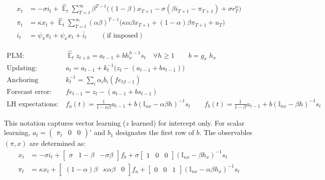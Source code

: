 \documentclass[11pt]{article}
\renewcommand{\[}{\begin{equation}}
\renewcommand{\]}{\end{equation}}
\DeclareMathOperator{\E}{\mathbb{E}}
\begin{document}
\vspace{-0.5cm}

\begin{align}
x_t &=  -\sigma i_t +\hat{\E}_t \sum_{T=t}^{\infty} \beta^{T-t }\big( (1-\beta)x_{T+1} - \sigma(\beta i_{T+1} - \pi_{T+1}) +\sigma r_T^n \big)  \label{A1}  \\
\pi_t &= \kappa x_t +\hat{\E}_t \sum_{T=t}^{\infty} (\alpha\beta)^{T-t }\big( \kappa \alpha \beta x_{T+1} + (1-\alpha)\beta \pi_{T+1} + u_T\big) \label{A2}  \\
i_t &= \psi_{\pi}\pi_t + \psi_{x} x_t  + \bar{i}_t \label{TR} \quad \quad (\text{if imposed})
\end{align}

\vspace{-1.2cm}

\begin{align}
\text{PLM:} \quad \quad & \hat{\E}_t z_{t+h}  =  a_{t-1} + bh_x^{h-1}s_t  \quad \forall h\geq 1 \quad \quad b = g_x\; h_x \quad \quad  \label{PLM} \\
\text{Updating:} \quad \quad & a_{t}  =a_{t-1} +k_t^{-1}\big(z_{t} -(a_{t-1}+b s_{t-1}) \big)  \label{A5} \\
\text{Anchoring function:} \quad \quad & k^{-1}_t  = \sum_i \alpha_i b_i(fe_{t|t-1}) \label{A6}\\
\text{Forecast error:} \quad \quad & fe_{t-1}  = z_t - (a_{t-1}+b s_{t-1}) \label{A7} \\
\text{LH expectations:} \quad \quad & f_a(t) = \frac{1}{1-\alpha\beta}a_{t-1}  + b(\mathbb{I}_{nx} - \alpha\beta h)^{-1}s_t \quad \quad  f_b(t) = \frac{1}{1-\beta}a_{t-1}  + b(\mathbb{I}_{nx} - \beta h)^{-1}s_t  \label{A8}
\end{align}

\vspace{-0.5cm}

This notation captures vector learning ($z$ learned) for intercept only. For scalar learning, $a_t= \begin{pmatrix} \bar{\pi}_t & 0 & 0\end{pmatrix}' $ and $b_1$ designates the first row of $b$. The observables $(\pi, x)$ are determined as:
\begin{align}
x_t &=  -\sigma i_t + \begin{bmatrix} \sigma & 1-\beta & -\sigma\beta \end{bmatrix} f_b + \sigma \begin{bmatrix} 1 & 0 & 0 \end{bmatrix} (\mathbb{I}_{nx} - \beta h_x)^{-1} s_t \label{A9} \\
\pi_t &= \kappa x_t  + \begin{bmatrix} (1-\alpha)\beta & \kappa\alpha\beta & 0 \end{bmatrix}  f_a + \begin{bmatrix} 0 & 0 & 1 \end{bmatrix}  (\mathbb{I}_{nx} - \alpha \beta h_x)^{-1}  s_t \label{A10}
\end{align}
\end{document}
